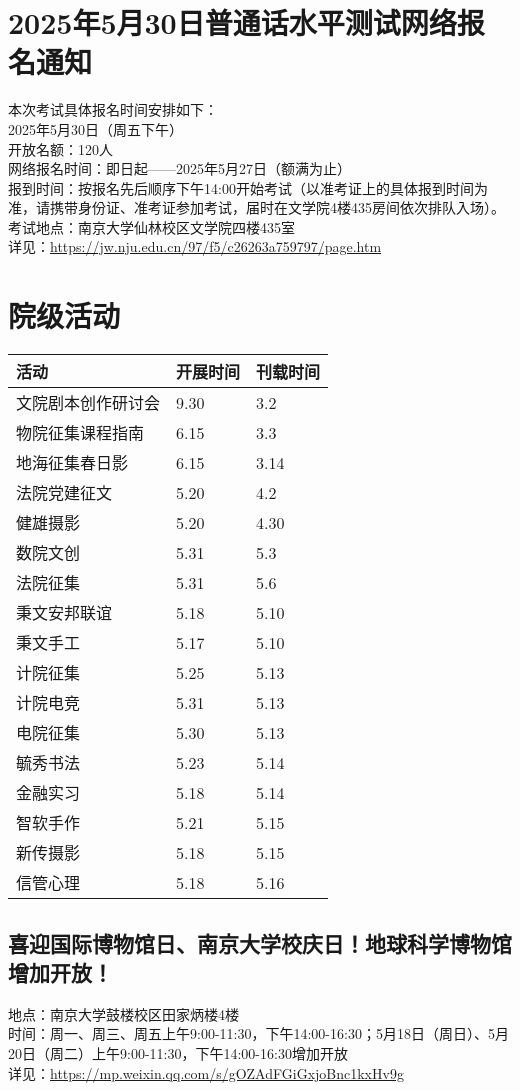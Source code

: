 \documentclass[letterpaper, 12pt]{article}
\begin{document}
\begin{multicols}{2}
\section{2025年5月30日普通话水平测试网络报名通知} %
本次考试具体报名时间安排如下：
\\2025年5月30日（周五下午）  
\\开放名额：120人
\\网络报名时间：即日起——2025年5月27日（额满为止）
\\报到时间：按报名先后顺序下午14:00开始考试（以准考证上的具体报到时间为准，请携带身份证、准考证参加考试，届时在文学院4楼435房间依次排队入场）。 
\\考试地点：南京大学仙林校区文学院四楼435室
\\详见：\url{https://jw.nju.edu.cn/97/f5/c26263a759797/page.htm}
\section{院级活动}
\begin{tabular}{|>{\centering\arraybackslash}m{}|m{}|m{}|}
\hline
    活动 & 开展时间 & 刊载时间\\
    \hline\hline
    文院剧本创作研讨会 & 9.30 & 3.2\\
    物院征集课程指南 & 6.15 & 3.3\\
    地海征集春日影 & 6.15 & 3.14\\
    法院党建征文 & 5.20 & 4.2\\
    健雄摄影 & 5.20 & 4.30\\
    数院文创 & 5.31 & 5.3\\
    法院征集 & 5.31 & 5.6\\
    秉文安邦联谊 & 5.18 & 5.10\\
    秉文手工 & 5.17 & 5.10\\
    计院征集 & 5.25 & 5.13\\
    计院电竞 & 5.31 & 5.13\\
    电院征集 & 5.30 & 5.13\\
    毓秀书法 & 5.23 & 5.14\\
    金融实习 & 5.18 & 5.14\\
    智软手作 & 5.21 & 5.15\\
    新传摄影 & 5.18 & 5.15\\
    信管心理 & 5.18 & 5.16\\
    
    \hline
\end{tabular}
\subsection{喜迎国际博物馆日、南京大学校庆日！地球科学博物馆增加开放！} %
地点：南京大学鼓楼校区田家炳楼4楼
\\时间：周一、周三、周五上午9:00-11:30，下午14:00-16:30；5月18日（周日）、5月20日（周二）上午9:00-11:30，下午14:00-16:30增加开放
\\详见：\url{https://mp.weixin.qq.com/s/gOZAdFGiGxjoBnc1kxHv9g}


\end{multicols}
\end{document}
